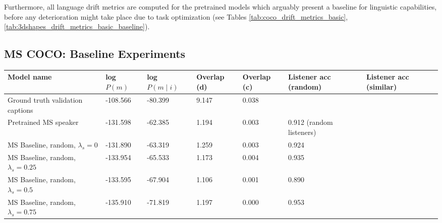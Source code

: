 Furthermore, all language drift metrics are computed for the pretrained models which arguably present a baseline for linguistic capabilities, before any deterioration might take place due to task optimization (see Tables \ref{tab:coco_drift_metrics_basic}, \ref{tab:3dshapes_drift_metrics_basic_baseline}).

\subsection{MS COCO: Baseline Experiments}
\label{expt:coco_baseline}

\begin{table}[]
	\begin{tabularx}{\textwidth}{|X|l|l|X|X|X|X|}
		\hline
		\textbf{Model name}                                    & \textbf{log $P(m)$} & \textbf{log $P(m \mid i)$} & \textbf{Overlap (d)} & \textbf{Overlap (c)} & \textbf{Listener acc (random)} & \textbf{Listener acc (similar)} \\ \hline
		Ground truth validation captions               &     -108.566            &          -80.399             &    9.147           &       0.038          &            &                           \\ \hline
		Pretrained MS speaker               &      -131.598            &           -62.385             &          1.194            &           0.003           & 0.912 (random listeners)                 &                                           \\ \hline
		MS Baseline, random, $\lambda_s = 0$      &     -131.890              &         -63.319               &        1.259       &         0.003             &             0.924                             &                                           \\ \hline
		MS Baseline, random, $\lambda_s = 0.25$    &      -133.954             &          -65.533              &          1.173            &       0.004               &           0.935                               &                                           \\ \hline
		MS Baseline, random, $\lambda_s = 0.5$      &         -133.595         &           -67.904             &        1.106              &        0.001              &             0.890                             &                                           \\ \hline
		MS Baseline, random, $\lambda_s = 0.75$   &       -135.910            &             -71.819          &        1.197              &        0.000              & 0.953                                    &                                           \\ \hline

\end{tabularx}
\end{table}
